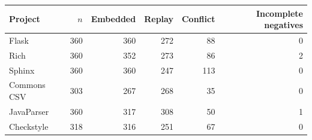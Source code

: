 \begin{tabular}{lrrrrr}
\toprule
Project & $n$ & Embedded & Replay & Conflict & Incomplete negatives \\
\midrule
Flask & 360 & 360 & 272 & 88 & 0 \\
Rich & 360 & 352 & 273 & 86 & 2 \\
Sphinx & 360 & 360 & 247 & 113 & 0 \\
Commons CSV & 303 & 267 & 268 & 35 & 0 \\
JavaParser & 360 & 317 & 308 & 50 & 1 \\
Checkstyle & 318 & 316 & 251 & 67 & 0 \\
\bottomrule
\end{tabular}
